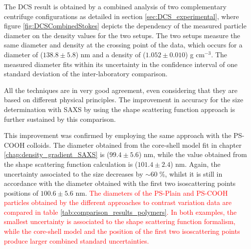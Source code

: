 The DCS result is obtained by a combined analysis of two complementary centrifuge configurations as detailed in section \ref{sec:DCS_experimental}, where figure \ref{fig:DCSCombinedStokes} depicts the dependency of the measured particle diameter on the density values for the two setups. The two setups measure the same diameter and density at the crossing point of the data, which occurs for a diameter of ($138.8\pm5.8$) nm and a density of ($1.052\pm0.010$) g cm$^{-3}$. The measured diameter fits within its uncertainty in the confidence interval of one standard deviation of the inter-laboratory comparison.

\begin{figure*}
	\begin{center}
		
	\end{center}
	\caption[Simultaneous size and density determination of the PS-Plain particles with a DCS combined approach.]{Dependence of the intensity-based modal Stokes' diameter on the particle density for the PS-Plain particles analysed in H$_2$O-sucrose (black) and D$_2$O-sucrose (red) gradients. The arrow indicates the crossing point of the data, where the two setups measure the same diameter and density of the colloid. This occurs for a diameter of ($138.8\pm5.8$) nm and a density of ($1.052\pm0.010$) g cm$^{-3}$}
	\label{fig:DCSCombinedStokes}
\end{figure*}

All the techniques are in very good agreement, even considering that they are based on different physical principles. The improvement in accuracy for the size determination with SAXS by using the shape scattering function approach is further sustained by this comparison. 

This improvement was confirmed by employing the same approach with the PS-COOH colloids. The diameter obtained from the core-shell model fit in chapter \ref{chap:density_gradient_SAXS} is ($99.4\pm5.6$) nm, while the value obtained from the shape scattering function calculation is ($101.4\pm2.4$) nm. Again, the uncertainty associated to the size decreases by $\sim 60\;\%$, whilst it is still in accordance with the diameter obtained with the first two isoscattering points positions of $100.6\pm 5.6$ nm. \textcolor{red}{The diameters of the PS-Plain and PS-COOH particles obtained by the different approaches to contrast variation data are compared in table \ref{tab:comparison_results_polymers}. In both examples, the smallest uncertainty is associated to the shape scattering function formalism, while the core-shell model and the position of the first two isoscattering points produce larger combined standard uncertainties.}

